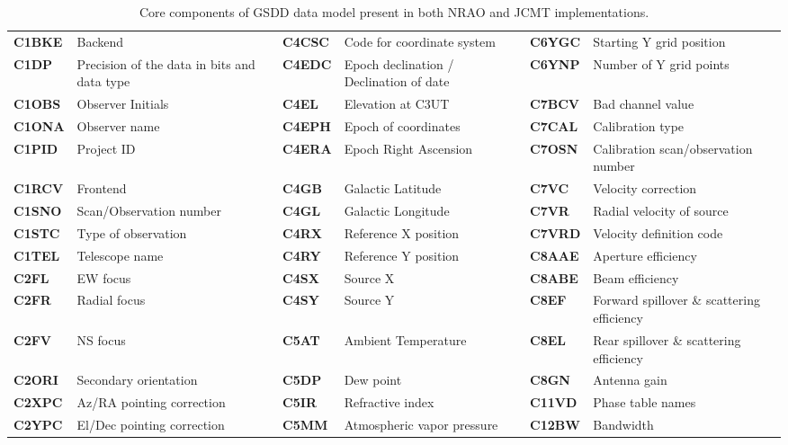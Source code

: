 \documentclass[final,authoryear,5p,times,twocolumn]{elsarticle}
\begin{document}
\begin{table}[t]
\centering
\caption{Core components of GSDD data model present in both NRAO and
  JCMT implementations.}
\label{tab:core}
\begin{tabular}{|lp{1.5in}|lp{1.5in}|lp{1.5in}|}
\hline
\textbf{C1BKE} & Backend & \textbf{C4CSC} & Code for coordinate system & \textbf{C6YGC} & Starting Y grid position \\
\textbf{C1DP} & Precision of the data in bits and data type & \textbf{C4EDC} & Epoch declination / Declination of date & \textbf{C6YNP} & Number of Y grid points \\
\textbf{C1OBS} & Observer Initials & \textbf{C4EL} & Elevation at C3UT & \textbf{C7BCV} & Bad channel value \\
\textbf{C1ONA} & Observer name & \textbf{C4EPH} & Epoch of coordinates & \textbf{C7CAL} & Calibration type \\
\textbf{C1PID} & Project ID & \textbf{C4ERA} & Epoch Right Ascension & \textbf{C7OSN} & Calibration scan/observation number \\
\textbf{C1RCV} & Frontend & \textbf{C4GB} & Galactic Latitude & \textbf{C7VC} & Velocity correction \\
\textbf{C1SNO} & Scan/Observation number & \textbf{C4GL} & Galactic Longitude & \textbf{C7VR} & Radial velocity of source \\
\textbf{C1STC} & Type of observation & \textbf{C4RX} & Reference X position & \textbf{C7VRD} & Velocity definition code \\
\textbf{C1TEL} & Telescope name & \textbf{C4RY} & Reference Y position & \textbf{C8AAE} & Aperture efficiency \\
\textbf{C2FL} & EW focus & \textbf{C4SX} & Source X & \textbf{C8ABE} & Beam efficiency \\
\textbf{C2FR} & Radial focus & \textbf{C4SY} & Source Y & \textbf{C8EF} & Forward spillover \& scattering efficiency \\
\textbf{C2FV} & NS focus & \textbf{C5AT} & Ambient Temperature & \textbf{C8EL} & Rear spillover \& scattering efficiency \\
\textbf{C2ORI} & Secondary orientation & \textbf{C5DP} & Dew point & \textbf{C8GN} & Antenna gain \\
\textbf{C2XPC} & Az/RA pointing correction & \textbf{C5IR} & Refractive index & \textbf{C11VD} & Phase table names \\
\textbf{C2YPC} & El/Dec pointing correction & \textbf{C5MM} & Atmospheric vapor pressure & \textbf{C12BW} & Bandwidth \\

\end{tabular}
\end{table}
\end{document}
